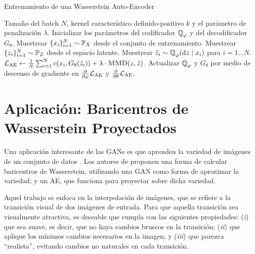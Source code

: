 \begin{algorithm}[H]
    \caption{Entrenamiento de una Wasserstein Auto-Encoder}\label{alg:WAE}
    \begin{algorithmic}[1]
        \Require Tamaño del batch $N$, kernel característico definido-positivo $k$ y el parámetro de penalización $\lambda$.
        \State{}
        \EndFunction
        \State Inicializar los parámetros del codificador $\ProbQ_\varphi$ y del decodificador $G_\theta$.
        \State Muestrear $\{x_i\}_{i=1}^{N} \sim \Prob_X$ desde el conjunto de entrenamiento.
        \State Muestrear $\{z_i\}_{i=1}^{N} \sim \Prob_Z$ desde el espacio latente.
        \State Muestrear $\tilde z_i \sim \ProbQ_\varphi(\dd z \mid x_i)$ para $i=1\dots N$.
        \State $\cL_{\mathrm{AE}} \gets \frac{1}{N}\sum_{i=1}^{N} c(x_i, G_\theta(\tilde z_i)) + \lambda \cdot \Call{MMD}{z, \tilde z}$.
        \State Actualizar $\ProbQ_\varphi$ y $G_\theta$ por medio de descenso de gradiente en $\pdv{\varphi} \cL_{\mathrm{AE}}$ y $\pdv{\theta} \mathcal{L}_{\mathrm{AE}}$.
        \EndWhile
    \end{algorithmic}
\end{algorithm}


\section{Aplicación: Baricentros de Wasserstein Proyectados}\label{sec:app-bar-wass-Proyectados}  %


Una aplicación interesante de las GANs es que aprenden la variedad de imágenes de un conjunto de datos \cite{zhu2016generative}. Los autores de \cite{simon2020barycenters} proponen una forma de calcular baricentros de Wasserstein, utilizando una GAN como forma de aproximar la variedad; y un AE, que funciona para proyectar sobre dicha variedad.

Aquel trabajo se enfoca en la interpolación de imágenes,
que se refiere a la transición visual de dos imágenes de entrada. Para que aquella transición sea visualmente atractiva, es deseable que cumpla con las siguientes propiedades: (\textit{i}) que sea suave, es decir, que no haya cambios bruscos en la transición; (\textit{ii}) que aplique los mínimos cambios necesarios en la imagen; y (\textit{iii}) que parezca ``realista'', evitando cambios no naturales en cada transición.

